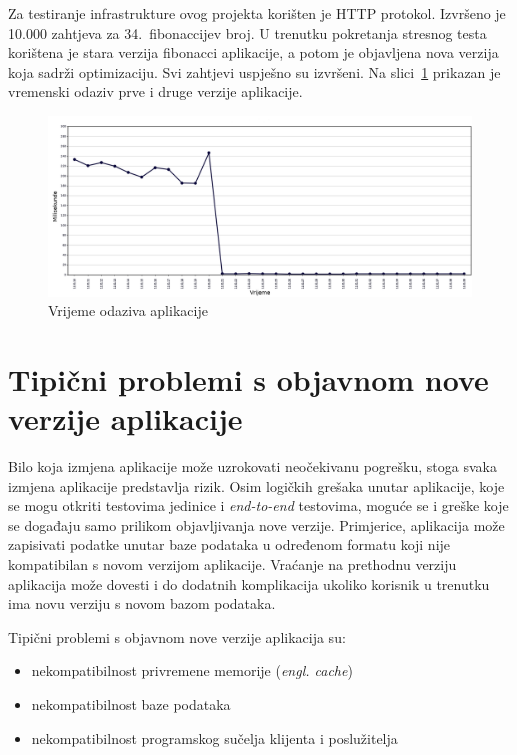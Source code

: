 Za testiranje infrastrukture ovog projekta korišten je HTTP protokol. Izvršeno je 10.000 zahtjeva
za 34.~fibonaccijev broj. U trenutku pokretanja stresnog testa korištena je stara verzija fibonacci
aplikacije, a potom je objavljena nova verzija koja sadrži optimizaciju. Svi zahtjevi uspješno su
izvršeni. Na slici~\ref{fig:04stresstest} prikazan je vremenski odaziv prve i druge verzije
aplikacije.

\begin{figure}[h]
    \centering
    \includegraphics[width=\textwidth]{img/04/response_time.png}
    \caption{Vrijeme odaziva aplikacije}%
    \label{fig:04stresstest}
\end{figure}

\section{Tipični problemi s objavnom nove verzije aplikacije}
Bilo koja izmjena aplikacije može uzrokovati neočekivanu pogrešku, stoga svaka izmjena aplikacije
predstavlja rizik. Osim logičkih grešaka unutar aplikacije, koje se mogu otkriti testovima jedinice
i \textit{end-to-end} testovima, moguće se i greške koje se događaju samo prilikom objavljivanja
nove verzije. Primjerice, aplikacija može zapisivati podatke unutar baze podataka u određenom
formatu koji nije kompatibilan s novom verzijom aplikacije. Vraćanje na prethodnu verziju aplikacija
može dovesti i do dodatnih komplikacija ukoliko korisnik u trenutku ima novu verziju s novom bazom
podataka.

Tipični problemi s objavnom nove verzije aplikacija su:
\begin{itemize}
    \item nekompatibilnost privremene memorije (\textit{engl. cache})
    \item nekompatibilnost baze podataka
    \item nekompatibilnost programskog sučelja klijenta i poslužitelja
\end{itemize}

